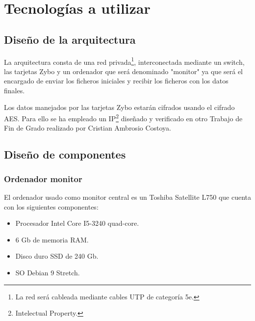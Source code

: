 \section{Tecnologías a utilizar}
\subsection{Diseño de la arquitectura}
La arquitectura consta de una red privada\footnote{La red será cableada mediante cables UTP de categoría 5e.}, interconectada mediante un switch, las tarjetas Zybo y un ordenador que será denominado "monitor" ya que será el encargado de enviar los ficheros iniciales y recibir los ficheros con los datos finales.

Los datos manejados por las tarjetas Zybo estarán cifrados usando el cifrado AES. Para ello se ha empleado un IP\footnote{Intelectual Property.} diseñado y verificado en otro Trabajo de Fin de Grado realizado por Cristian Ambrosio Costoya.

\subsection{Diseño de componentes}
\subsubsection{Ordenador monitor}
El ordenador usado como monitor central es un Toshiba Satellite L750 que cuenta con los siguientes componentes:
\begin{itemize}
	\item Procesador Intel Core I5-3240 quad-core.
	\item 6 Gb de memoria RAM.
	\item Disco duro SSD de 240 Gb.
	\item SO Debian 9 Stretch.
\end{itemize}

